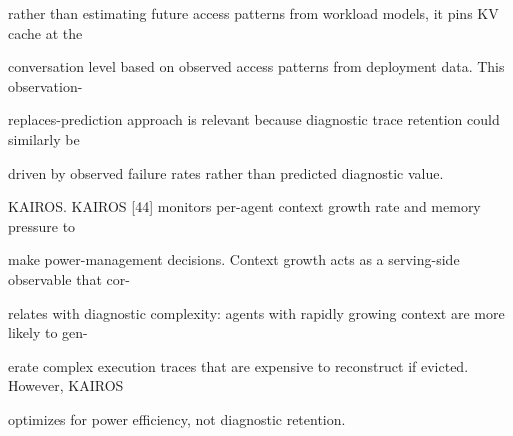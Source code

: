 \begin{flushleft}
\noindent rather than estimating future access patterns from workload models, it pins KV cache at the\par
\noindent conversation level based on observed access patterns from deployment data. This observation-\par
\noindent replaces-prediction approach is relevant because diagnostic trace retention could similarly be\par
\noindent driven by observed failure rates rather than predicted diagnostic value.\par
\par\smallskip
\noindent KAIROS. KAIROS [44] monitors per-agent context growth rate and memory pressure to\par
\noindent make power-management decisions. Context growth acts as a serving-side observable that cor-\par
\noindent relates with diagnostic complexity: agents with rapidly growing context are more likely to gen-\par
\noindent erate complex execution traces that are expensive to reconstruct if evicted. However, KAIROS\par
\noindent optimizes for power efficiency, not diagnostic retention.\par
\end{flushleft}
